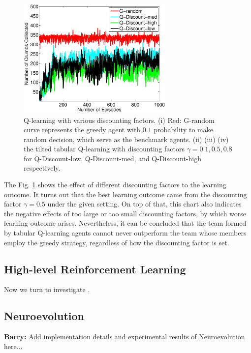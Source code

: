\documentclass[conference]{IEEEtran}
\begin{document}
\begin{figure}[!t]
\centering
\includegraphics[width=3.0in]{./figures/RL/init_setup2.eps}
\caption{Q-learning with various discounting factors. (i) Red: G-random curve
    represents the greedy agent with $0.1$ probability to make random
    decision, which serve as the benchmark agents. 
    (ii) (iii) (iv) the tilted tabular Q-learning with discounting factors
    $\gamma = 0.1, 0.5, 0.8$ for Q-Discount-low, Q-Discount-med, and
    Q-Discount-high respectively.}
\label{fig:RL_init2}
\end{figure}

The Fig. \ref{fig:RL_init2} shows the effect of different discounting factors
to the learning outcome. It turns out that the best learning outcome came from
the discounting factor $\gamma = 0.5$ under the given setting. On top of
that, this chart also indicates the negative effects of too large or too small
discounting factors, by which worse learning outcome arises. Nevertheless, it
can be concluded that the team formed by tabular Q-learning agents cannot
never outperform the team whose members employ the greedy strategy, regardless
of how the discounting factor is set.

\subsection{High-level Reinforcement Learning}
Now we turn to investigate .

\subsection{Neuroevolution}

\textbf{Barry:}
Add implementation details and experimental results of Neuroevolution here...

\end{document}
